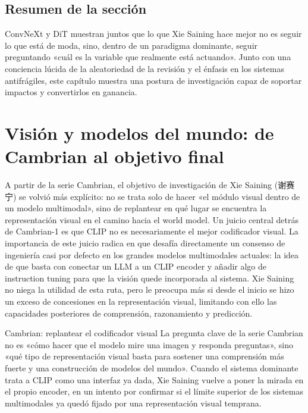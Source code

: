 \documentclass[a4paper,12pt]{article}
\begin{document}
\subsection{Resumen de la sección}

ConvNeXt y DiT muestran juntos que lo que Xie Saining hace mejor no es seguir lo que está de moda, sino, dentro de un paradigma dominante, seguir preguntando «cuál es la variable que realmente está actuando». Junto con una conciencia lúcida de la aleatoriedad de la revisión y el énfasis en los sistemas antifrágiles, este capítulo muestra una postura de investigación capaz de soportar impactos y convertirlos en ganancia.
\section{Visión y modelos del mundo: de Cambrian al objetivo final}

A partir de la serie Cambrian, el objetivo de investigación de Xie Saining (谢赛宁) se volvió más explícito: no se trata solo de hacer «el módulo visual dentro de un modelo multimodal», sino de replantear en qué lugar se encuentra la representación visual en el camino hacia el world model. Un juicio central detrás de Cambrian-1 es que CLIP no es necesariamente el mejor codificador visual. La importancia de este juicio radica en que desafía directamente un consenso de ingeniería casi por defecto en los grandes modelos multimodales actuales: la idea de que basta con conectar un LLM a un CLIP encoder y añadir algo de instruction tuning para que la visión quede incorporada al sistema. Xie Saining no niega la utilidad de esta ruta, pero le preocupa más si desde el inicio se hizo un exceso de concesiones en la representación visual, limitando con ello las capacidades posteriores de comprensión, razonamiento y predicción.

\begin{knowledgebox}{Cambrian: replantear el codificador visual}
La pregunta clave de la serie Cambrian no es «cómo hacer que el modelo mire una imagen y responda preguntas», sino «qué tipo de representación visual basta para sostener una comprensión más fuerte y una construcción de modelos del mundo». Cuando el sistema dominante trata a CLIP como una interfaz ya dada, Xie Saining vuelve a poner la mirada en el propio encoder, en un intento por confirmar si el límite superior de los sistemas multimodales ya quedó fijado por una representación visual temprana.
\end{knowledgebox}
\end{document}
